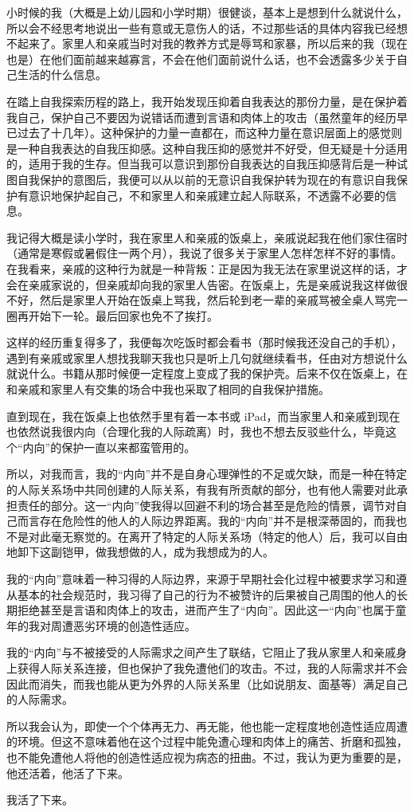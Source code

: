 小时候的我（大概是上幼儿园和小学时期）很健谈，基本上是想到什么就说什么，所以会不经思考地说出一些有意或无意伤人的话，不过那些话的具体内容我已经想不起来了。家里人和亲戚当时对我的教养方式是辱骂和家暴，所以后来的我（现在也是）在他们面前越来越寡言，不会在他们面前说什么话，也不会透露多少关于自己生活的什么信息。

在踏上自我探索历程的路上，我开始发现压抑着自我表达的那份力量，是在保护着我自己，保护自己不要因为说错话而遭到言语和肉体上的攻击（虽然童年的经历早已过去了十几年）。这种保护的力量一直都在，而这种力量在意识层面上的感觉则是一种自我表达的自我压抑感。这种自我压抑的感觉并不好受，但无疑是十分适用的，适用于我的生存。但当我可以意识到那份自我表达的自我压抑感背后是一种试图自我保护的意图后，我便可以从以前的无意识自我保护转为现在的有意识自我保护\pozhehao{}有意识地保护起自己，不和家里人和亲戚建立起人际联系，不透露不必要的信息。


我记得大概是读小学时，我在家里人和亲戚的饭桌上，亲戚说起我在他们家住宿时（通常是寒假或暑假住一两个月），我说了很多关于家里人怎样怎样不好的事情。在我看来，亲戚的这种行为就是一种背叛：正是因为我无法在家里说这样的话，才会在亲戚家说的，但亲戚却向我的家里人告密。在饭桌上，先是亲戚说我这样做很不好，然后是家里人开始在饭桌上骂我，然后轮到老一辈的亲戚骂\pozhehao{}被全桌人骂完一圈再开始下一轮。最后回家也免不了挨打。

这样的经历重复得多了，我便每次吃饭时都会看书（那时候我还没自己的手机），遇到有亲戚或家里人想找我聊天我也只是听上几句就继续看书，任由对方想说什么就说什么。书籍从那时候便一定程度上变成了我的保护壳。后来不仅在饭桌上，在和亲戚和家里人有交集的场合中我也采取了相同的自我保护措施。

直到现在，我在饭桌上也依然手里有着一本书或 iPad，而当家里人和亲戚到现在也依然说我很内向（合理化我的人际疏离）时，我也不想去反驳些什么，毕竟这个“内向”的保护一直以来都蛮管用的。


所以，对我而言，我的“内向”并不是自身心理弹性的不足或欠缺，而是一种在特定的人际关系场中共同创建的人际关系，有我有所贡献的部分，也有他人需要对此承担责任的部分。这一“内向”使我得以回避不利的场合甚至是危险的情景，调节对自己而言存在危险性的他人的人际边界距离。我的“内向”并不是根深蒂固的，而我也不是对此毫无察觉的。在离开了特定的人际关系场（特定的他人）后，我可以自由地卸下这副铠甲，做我想做的人，成为我想成为的人。

我的“内向”意味着一种习得的人际边界，来源于早期社会化过程中被要求学习和遵从基本的社会规范时，我习得了自己的行为不被赞许的后果\pozhehao{}被自己周围的他人的长期拒绝甚至是言语和肉体上的攻击，进而产生了“内向”。因此这一“内向”也属于童年的我对周遭恶劣环境的创造性适应。

我的“内向”与不被接受的人际需求之间产生了联结，它阻止了我从家里人和亲戚身上获得人际关系连接，但也保护了我免遭他们的攻击。不过，我的人际需求并不会因此而消失，而我也能从更为外界的人际关系里（比如说朋友、面基等）满足自己的人际需求。


所以我会认为，即使一个个体再无力、再无能，他也能一定程度地创造性适应周遭的环境。但这不意味着他在这个过程中能免遭心理和肉体上的痛苦、折磨和孤独，也不能免遭他人将他的创造性适应视为病态的扭曲。不过，我认为更为重要的是，他还活着，他活了下来。

我活了下来。

